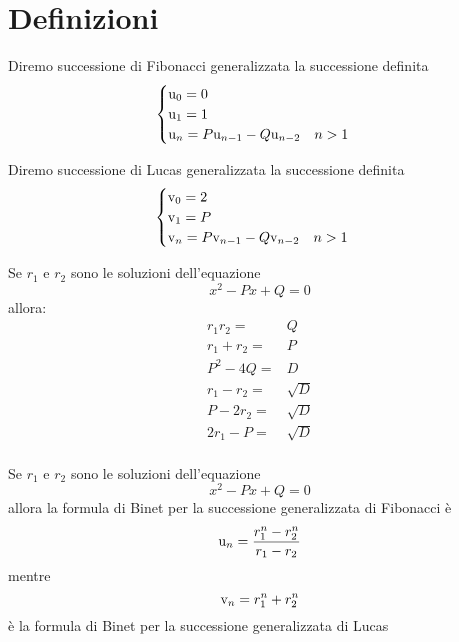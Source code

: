 \section{Definizioni}
\begin{defn}
	Diremo successione di Fibonacci generalizzata la successione definita
	\begin{equation}
		\begin{cases}
			\mathrm{u}_{0}=0\\
			\mathrm{u}_{1}=1\\
			\mathrm{u}_{n}=P\mathrm{u}_{n-1}-Q\mathrm{u}_{n-2}\quad n>1\\
		\end{cases}
	\end{equation} 
\end{defn}\cite{Rabinowitz_1996}
\begin{defn}
	Diremo successione di Lucas generalizzata la successione definita
	\begin{equation}
		\begin{cases}
			\mathrm{v}_{0}=2\\
			\mathrm{v}_{1}=P\\
			\mathrm{v}_{n}=P\mathrm{v}_{n-1}-Q\mathrm{v}_{n-2}\quad n>1\\
		\end{cases}
	\end{equation}
\end{defn}\cite{Rabinowitz_1996}
\begin{lem}[Proprietà]\label{lem:FibonacciGenLemma}
	Se $r_{1}$ e $r_{2}$ sono le soluzioni dell'equazione \begin{equation}
		x^2-Px+Q=0
	\end{equation} allora:
	\begin{align*}
		r_{1}r_{2}=&{}Q\\
		r_{1}+r_{2}=&{}P\\
		P^2-4Q=&{}D\\
		r_{1}-r_{2}=&{}\sqrt{D}\\
		P-2r_{2}=&{}\sqrt{D}\\
		2r_{1}-P=&{}\sqrt{D}\\
	\end{align*}
\end{lem}  
\begin{thm}\label{thm:FormulaBinetgeneralizzatarr}
	Se $r_{1}$ e 	$r_{2}$ sono le soluzioni dell'equazione \begin{equation}
		x^2-Px+Q=0
	\end{equation} allora la formula di Binet per la successione
	generalizzata 
	di Fibonacci è \begin{equation}
		\mathrm{u}_{n}=\dfrac{r_{1}^n-r_{2}^n}{r_{1}-r_{2}}
	\end{equation}
	mentre \begin{equation}
		\mathrm{v}_{n}=r_{1}^n+r_{2}^n
	\end{equation}
	è la formula di Binet per la successione generalizzata di Lucas 
\end{thm}\cite{Rabinowitz_1996}
